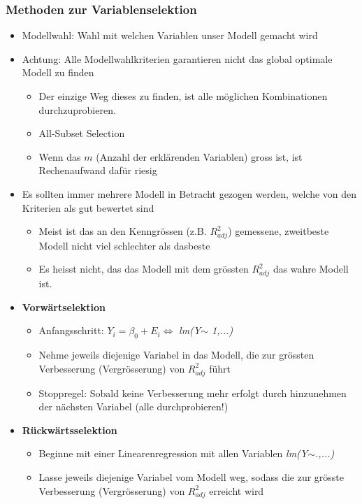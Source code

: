 \subsubsection{Methoden zur Variablenselektion }
\begin{itemize}
	\item Modellwahl: Wahl mit welchen Variablen unser Modell gemacht wird
	\item Achtung: Alle Modellwahlkriterien garantieren nicht das global optimale Modell zu finden
	\begin{itemize}
		\item Der einzige Weg dieses zu finden, ist alle möglichen Kombinationen durchzuprobieren.
		\item All-Subset Selection
		\item Wenn das $m$ (Anzahl der erklärenden Variablen) gross ist, ist Rechenaufwand dafür riesig
	\end{itemize}
	\item Es sollten immer mehrere Modell in Betracht gezogen werden, welche von den Kriterien als gut bewertet sind
	\begin{itemize}
		\item Meist ist das an den Kenngrössen (z.B. $R_{adj}^2$) gemessene, zweitbeste Modell nicht viel schlechter als das\glqq beste \grqq
		\item Es heisst nicht, das das Modell mit dem grössten $R_{adj}^2$ das \glqq wahre \grqq Modell ist.
	\end{itemize}
	\item \textbf{Vorwärtselektion}
	\begin{itemize}
		\item Anfangsschritt: $Y_i=\beta_0+E_i \Leftrightarrow$ \textit{lm(Y$\sim$ 1,...)}
		\item Nehme jeweils diejenige Variabel in das Modell, die zur grössten Verbesserung (Vergrösserung) von $R_{adj}^2$ führt
		\item Stoppregel: Sobald keine Verbesserung mehr erfolgt durch hinzunehmen der nächsten Variabel (alle durchprobieren!)
	\end{itemize}
	\item \textbf{Rückwärtsselektion}
	\begin{itemize}
		\item Beginne mit einer Linearenregression mit allen Variablen \textit{lm(Y$\sim$.,...)}
		\item Lasse jeweils diejenige Variabel vom Modell weg, sodass die zur grösste Verbesserung (Vergrösserung) von $R_{adj}^2$ erreicht wird

\end{itemize}
\end{itemize}
